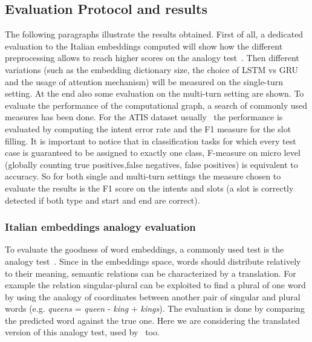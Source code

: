 \subsection{Evaluation Protocol and results}
\label{validationMeasures}

The following paragraphs illustrate the results obtained. First of all, a dedicated evaluation to the Italian embeddings computed will show how the different preprocessing allows to reach higher scores on the analogy test~\cite{mikolov2013linguistic}. Then different variations (such as the embedding dictionary size, the choice of LSTM vs GRU and the usage of attention mechanism) will be measured on the single-turn setting. At the end also some evaluation on the multi-turn setting are shown. To evaluate the performance of the computational graph, a search of commonly used measures has been done. For the ATIS dataset usually~\cite{tur2010left} the performance is evaluated by computing the intent error rate and the F1 measure for the slot filling. It is important to notice that in classification tasks for which every test case is guaranteed to be assigned to exactly one class, F-measure on micro level (globally counting true positives,false negatives, false positives) is equivalent to accuracy. So for both single and multi-turn settings the measure chosen to evaluate the results is the F1 score on the intents and slots (a slot is correctly detected if both type and start and end are correct).

\subsubsection{Italian embeddings analogy evaluation}
To evaluate the goodness of word embeddings, a commonly used test is the analogy test~\cite{mikolov2013linguistic}. Since in the embeddings space, words should distribute relatively to their meaning, semantic relations can be characterized by a translation. For example the relation singular-plural can be exploited to find a plural of one word by using the analogy of coordinates between another pair of singular and plural words (e.g. \textit{queens} = \textit{queen} - \textit{king} + \textit{kings}). The evaluation is done by comparing the predicted word against the true one. Here we are considering the translated version of this analogy test, used by~\cite{berardi2015word} too.


